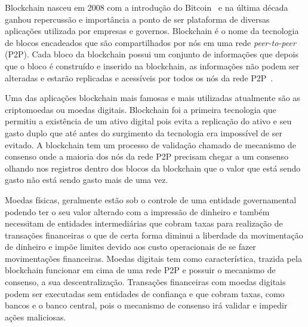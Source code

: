 \documentclass[12pt]{article}
\begin{document}
Blockchain nasceu em 2008 com a introdução do Bitcoin~\cite{nakamoto2008peer} e na última década ganhou repercussão e importância a ponto de ser plataforma de diversas aplicações utilizada por empresas e governos. Blockchain é o nome da tecnologia de blocos encadeados que são compartilhados por nós em uma rede \emph{peer-to-peer} (P2P). Cada bloco da blockchain possui um conjunto de informações que depois que o bloco é construído e inserido na blockchain, as informações não podem ser alteradas e estarão replicadas e acessíveis por todos os nós da rede P2P~\cite{greve2018blockchain}.

Uma das aplicações blockchain mais famosas e mais utilizadas atualmente são as criptomoedas ou moedas digitais. Blockchain foi a primeira tecnologia que permitiu a existência de um ativo digital pois evita a replicação do ativo e seu gasto duplo que até antes do surgimento da tecnologia era impossível de ser evitado\cite{greve2018blockchain}. A blockchain tem um processo de validação chamado de mecanismo de consenso onde a maioria dos nós da rede P2P precisam chegar a um consenso olhando nos registros dentro dos blocos da blockchain que o valor que está sendo gasto não está sendo gasto mais de uma vez\cite{braga2017segurancca}.

Moedas físicas, geralmente estão sob o controle de uma entidade governamental podendo ter o seu valor alterado com a impressão de dinheiro e também necessitam de entidades intermediárias que cobram taxas para realização de transações financeiras o que de certa forma diminui a liberdade da movimentação de dinheiro e impõe limites devido aos custo operacionais de se fazer movimentações financeiras. Moedas digitais tem como característica, trazida pela blockchain funcionar em cima de uma rede P2P e possuir o mecanismo de consenso, a sua descentralização\cite{nakamoto2008peer}. Transações financeiras com moedas digitais podem ser executadas sem entidades de confiança e que cobram taxas, como bancos e o banco central, pois o mecanismo de consenso irá validar e impedir ações maliciosas\cite{nakamoto2008peer}.
\end{document}
